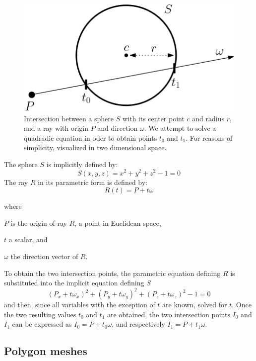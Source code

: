 \begin{figure}[h]
	\centering
	\includegraphics[width=.5\linewidth]{img/1 fundamentals/sphere_isect.png}
	\caption{Intersection between a sphere $S$ with its center point $c$ and radius $r$, and a ray with origin $P$ and direction $\omega$. We attempt to solve a quadradic equation in oder to obtain points $t_{0}$ and $t_{1}$. For reasons of simplicity, visualized in two dimensional space.} 
	\label{fig:sphere_isect}
\end{figure}

The sphere $S$ is implicitly defined by: 
\begin{equation} \label{eq:sphere}
S(x,y,z) = x^{2}+y^{2}+z^{2}-1 = 0
\end{equation}
The ray $R$ in its parametric form is defined by:
\begin{equation}\label{eq:ray}
R(t) = P + t\omega
\end{equation}

\noindent where
\begin{description}
	\setlength\itemsep{0.05em}
	\item  $P$ is the origin of ray $R$, a point in Euclidean space,
	\item  $t$ a scalar, and
	\item  $\omega$ the direction vector of $R$.
\end{description}

To obtain the two intersection points, the parametric equation defining $R$ is substituted into the implicit equation defining $S$
\begin{equation}\label{eq:substitution}
(P_{x}+t\omega_{x})^{2}+(P_{y}+t\omega_{y})^{2}+(P_{z}+t\omega_{z})^{2}-1 = 0
\end{equation}
and then, since all variables with the exception of $t$ are known, solved for $t$.
Once the two resulting values $t_{0}$ and $t_{1}$ are obtained, the two intersection points $I_{0}$ and $I_{1}$ can be expressed as $I_{0} = P + t_{0}\omega$, and respectively $I_{1} = P + t_{1}\omega$.

\subsection{Polygon meshes}

